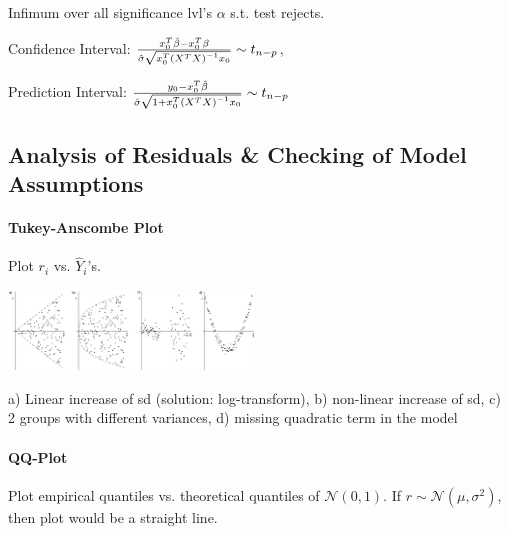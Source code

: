 \vspace{4pt}

 Infimum over all significance lvl's $\alpha$ s.t. test rejects.

\vspace{4pt}

Confidence Interval: $\frac{x_0^T \hat{\beta} - x_0^T \beta}{\hat{\sigma} \sqrt{x_0^T \left( X^T X \right)^{-1} x_0}} \sim t_{n-p}$,

Prediction Interval: $\frac{y_0 - x_0^T \hat{\beta}}{\hat{\sigma} \sqrt{1 + x_0^T \left( X^T X \right)^{-1} x_0}} \sim t_{n-p}$

\vspace{-5pt}

\subsection{Analysis of Residuals \& Checking of Model Assumptions}

\vspace{-5pt}

\paragraph{Tukey-Anscombe Plot} Plot $r_i$ vs. $\hat{Y}_i$'s.

\vspace{2pt}

\includegraphics[width=0.49\textwidth]{Bilder/TukeyAnscombe.png}

\vspace{1pt}

a) Linear increase of sd (solution: log-transform), b) non-linear increase of sd, c) 2 groups with different variances, d) missing quadratic term in the model

\vspace{-5pt}

\paragraph{QQ-Plot} Plot empirical quantiles vs. theoretical quantiles of $\mathcal{N}(0,1)$. If $r \sim \mathcal{N}(\mu,\sigma^2)$, then plot would be a straight line.

